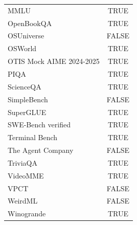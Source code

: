 \documentclass[11pt]{article}
\begin{document}
\begin{table}[htbp]
{\begin{tabular}{l c}
      MMLU                                    & TRUE  \\
      OpenBookQA                              & TRUE  \\
      OSUniverse                              & FALSE \\
      OSWorld                                 & TRUE  \\
      OTIS Mock AIME 2024-2025                & TRUE  \\
      PIQA                                    & TRUE  \\
      ScienceQA                               & TRUE  \\
      SimpleBench                             & FALSE \\
      SuperGLUE                               & TRUE  \\
      SWE-Bench verified                      & TRUE  \\
      Terminal Bench                          & TRUE  \\
      The Agent Company                       & FALSE \\
      TriviaQA                                & TRUE  \\
      VideoMME                                & TRUE  \\
      VPCT                                    & FALSE \\
      WeirdML                                 & FALSE \\
      Winogrande                              & TRUE  \\
    \end{tabular}
}
\end{table}
\end{document}
